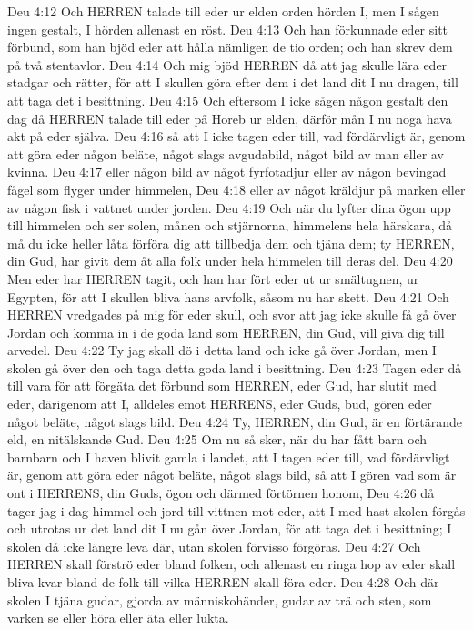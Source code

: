 Deu 4:12  Och HERREN talade till eder ur elden orden hörden I, men I sågen ingen gestalt, I hörden allenast en röst.
Deu 4:13  Och han förkunnade eder sitt förbund, som han bjöd eder att hålla nämligen de tio orden; och han skrev dem på två stentavlor.
Deu 4:14  Och mig bjöd HERREN då att jag skulle lära eder stadgar och rätter, för att I skullen göra efter dem i det land dit I nu dragen, till att taga det i besittning.
Deu 4:15  Och eftersom I icke sågen någon gestalt den dag då HERREN talade till eder på Horeb ur elden, därför mån I nu noga hava akt på eder själva.
Deu 4:16  så att I icke tagen eder till, vad fördärvligt är, genom att göra eder någon beläte, något slags avgudabild, något bild av man eller av kvinna.
Deu 4:17  eller någon bild av något fyrfotadjur eller av någon bevingad fågel som flyger under himmelen,
Deu 4:18  eller av något kräldjur på marken eller av någon fisk i vattnet under jorden.
Deu 4:19  Och när du lyfter dina ögon upp till himmelen och ser solen, månen och stjärnorna, himmelens hela härskara, då må du icke heller låta förföra dig att tillbedja dem och tjäna dem; ty HERREN, din Gud, har givit dem åt alla folk under hela himmelen till deras del.
Deu 4:20  Men eder har HERREN tagit, och han har fört eder ut ur smältugnen, ur Egypten, för att I skullen bliva hans arvfolk, såsom nu har skett.
Deu 4:21  Och HERREN vredgades på mig för eder skull, och svor att jag icke skulle få gå över Jordan och komma in i de goda land som HERREN, din Gud, vill giva dig till arvedel.
Deu 4:22  Ty jag skall dö i detta land och icke gå över Jordan, men I skolen gå över den och taga detta goda land i besittning.
Deu 4:23  Tagen eder då till vara för att förgäta det förbund som HERREN, eder Gud, har slutit med eder, därigenom att I, alldeles emot HERRENS, eder Guds, bud, gören eder något beläte, något slags bild.
Deu 4:24  Ty, HERREN, din Gud, är en förtärande eld, en nitälskande Gud.
Deu 4:25  Om nu så sker, när du har fått barn och barnbarn och I haven blivit gamla i landet, att I tagen eder till, vad fördärvligt är, genom att göra eder något beläte, något slags bild, så att I gören vad som är ont i HERRENS, din Guds, ögon och därmed förtörnen honom,
Deu 4:26  då tager jag i dag himmel och jord till vittnen mot eder, att I med hast skolen förgås och utrotas ur det land dit I nu gån över Jordan, för att taga det i besittning; I skolen då icke längre leva där, utan skolen förvisso förgöras.
Deu 4:27  Och HERREN skall förströ eder bland folken, och allenast en ringa hop av eder skall bliva kvar bland de folk till vilka HERREN skall föra eder.
Deu 4:28  Och där skolen I tjäna gudar, gjorda av människohänder, gudar av trä och sten, som varken se eller höra eller äta eller lukta.
